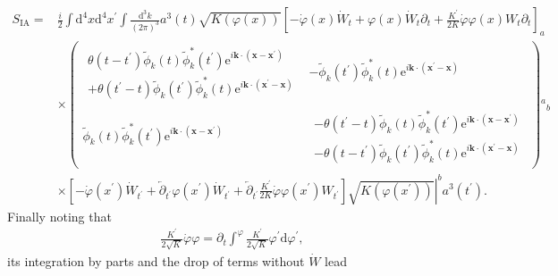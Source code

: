 \documentclass[aps, prd
, preprint
, nofootinbib 
]{revtex4-1}
\newcommand{\dd}{\mathrm{d}}
\newcommand{\ee}{\mathrm{e}}
\newcommand{\dk}{\frac{\dd^3k}{(2\pi)^3}}
\newcommand{\bae}[1]{\begin{align} #1 \end{align}}
\newcommand{\bpme}[1]{\begin{pmatrix} #1 \end{pmatrix}}
\begin{document}
\bae{
	S_\text{IA}=&\frac{i}{2}\int\dd^4x\dd^4x^\prime\int\dk a^3(t)\sqrt{K(\varphi(x))}
	\left[-\dot{\varphi}(x)\dot{W}_t+\varphi(x)\dot{W}_t\partial_t+\frac{K^\prime}{2K}\dot{\varphi}\varphi(x)W_t\partial_t\right]_a \nonumber \\
	&\times\bpme{
		\begin{array}{c}
			\theta(t-t^\prime)\tilde{\phi}_k(t)\tilde{\phi}_{k}^*(t^\prime)\ee^{i\mathbf{k}\cdot(\mathbf{x}-\mathbf{x}^\prime)} \\
			+\theta(t^\prime-t)\tilde{\phi}_{k}(t^\prime)\tilde{\phi}_k^{*}(t)\ee^{i\mathbf{k}\cdot(\mathbf{x}^\prime-\mathbf{x})}
		\end{array} &
		-\tilde{\phi}_{k}(t^\prime)\tilde{\phi}_k^{*}(t)\ee^{i\mathbf{k}\cdot(\mathbf{x}^\prime-\mathbf{x})} \\
		\tilde{\phi}_k(t)\tilde{\phi}_{k}^*(t^\prime)\ee^{i\mathbf{k}\cdot(\mathbf{x}-\mathbf{x}^\prime)} &
		\begin{array}{c}
			-\theta(t^\prime-t)\tilde{\phi}_k(t)\tilde{\phi}_{k}^*(t^\prime)\ee^{i\mathbf{k}\cdot(\mathbf{x}-\mathbf{x}^\prime)} \\
			-\theta(t-t^\prime)\tilde{\phi}_{k}(t^\prime)\tilde{\phi}_k^{*}(t)\ee^{i\mathbf{k}\cdot(\mathbf{x}^\prime-\mathbf{x})}
		\end{array}
	}{}^a{}_b \nonumber \\
	&\times \left.\left[-\dot{\varphi}(x^\prime)\dot{W}_{t^\prime}+\overleftarrow{\partial}_{t^\prime}\varphi(x^\prime)\dot{W}_{t^\prime}
	+\overleftarrow{\partial}_{t^\prime}\frac{K^\prime}{2K}\dot{\varphi}\varphi(x^\prime)W_{t^\prime}\right]
	\sqrt{K(\varphi(x^\prime))}\right|^ba^3(t^\prime).
}
Finally noting that 
\bae{
	\frac{K^\prime}{2\sqrt{K}}\dot{\varphi}\varphi=\partial_t\int^\varphi\frac{K^\prime}{2\sqrt{K}}\varphi^\prime\dd\varphi^\prime,
}
its integration by parts and the drop of terms without $\dot{W}$ lead
\end{document}

